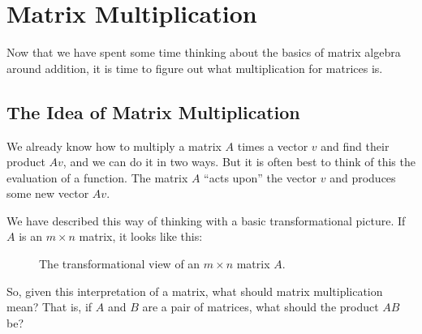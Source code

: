 \documentclass[elementsmain.tex]{subfiles}
\begin{document}
\section{Matrix Multiplication}

Now that we have spent some time thinking about the basics of matrix algebra around addition, it is time to figure out what multiplication for matrices is.


\subsection*{The Idea of Matrix Multiplication}

We already know how to multiply a matrix $A$ times a vector $v$ and find their product $Av$, and we can do it in two ways. But it is often best to think of this the evaluation of a function. The matrix $A$ ``acts upon'' the vector $v$ and produces some new vector $Av$. 

We have described this way of thinking with a basic transformational picture. If $A$ is an $m\times n$ matrix, it looks like this:
\begin{figure}[h!]
\centering
{}
\caption{The transformational view of an $m\times n$ matrix $A$.}
\label{fig:22-trans-pic}
\end{figure}

So, given this interpretation of a matrix, what should matrix multiplication mean? That is, if $A$ and $B$ are a pair of matrices, what should the product $AB$ be?
\end{document}
